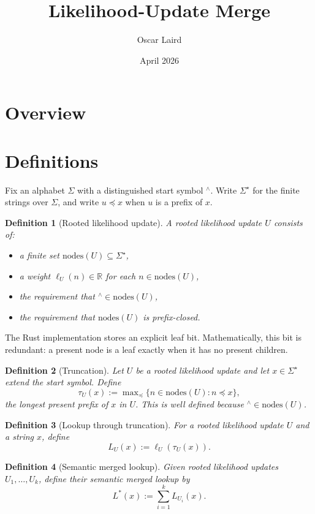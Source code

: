 \documentclass{article}
\title{Likelihood-Update Merge}
\author{Oscar Laird}
\date{April 2026}
\newtheorem{definition}{Definition}
\newcommand{\pref}{\preceq}
\begin{document}
\maketitle

\section{Overview}


\section{Definitions}

Fix an alphabet $\Sigma$ with a distinguished start symbol $^\wedge$.
Write $\Sigma^\star$ for the finite strings over $\Sigma$, and write
$u \pref x$ when $u$ is a prefix of $x$.

\begin{definition}[Rooted likelihood update]
A \emph{rooted likelihood update} $U$ consists of:
\begin{itemize}
\item a finite set $\mathrm{nodes}(U) \subseteq \Sigma^\star$,
\item a weight $\ell_U(n) \in \mathbb{R}$ for each $n \in \mathrm{nodes}(U)$,
\item the requirement that $^\wedge \in \mathrm{nodes}(U)$,
\item the requirement that $\mathrm{nodes}(U)$ is prefix-closed.
\end{itemize}
\end{definition}

The Rust implementation stores an explicit leaf bit.
Mathematically, this bit is redundant: a present node is a leaf exactly when it
has no present children.

\begin{definition}[Truncation]
Let $U$ be a rooted likelihood update and let $x \in \Sigma^\star$ extend the
start symbol. Define
\[
\tau_U(x) := \max\nolimits_{\pref}\{n \in \mathrm{nodes}(U) : n \pref x\},
\]
the longest present prefix of $x$ in $U$.
This is well defined because $^\wedge \in \mathrm{nodes}(U)$.
\end{definition}

\begin{definition}[Lookup through truncation]
For a rooted likelihood update $U$ and a string $x$, define
\[
L_U(x) := \ell_U(\tau_U(x)).
\]
\end{definition}

\begin{definition}[Semantic merged lookup]
Given rooted likelihood updates $U_1,\dots,U_k$, define their semantic merged
lookup by
\[
L^\ast(x) := \sum_{i=1}^k L_{U_i}(x).
\]
\end{definition}
\end{document}
